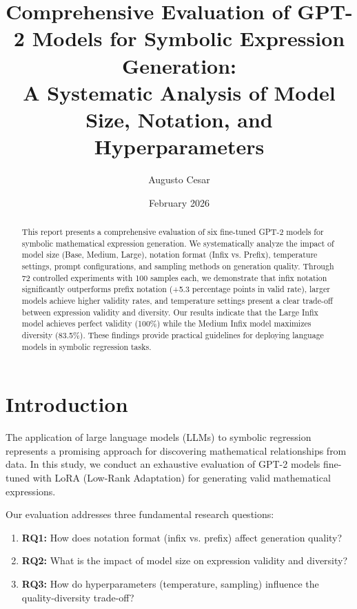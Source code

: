 \documentclass[11pt,a4paper]{article}
\title{Comprehensive Evaluation of GPT-2 Models for Symbolic Expression Generation:\\
A Systematic Analysis of Model Size, Notation, and Hyperparameters}
\author{Augusto Cesar}
\date{February 2026}
\begin{document}
\maketitle

\begin{abstract}
This report presents a comprehensive evaluation of six fine-tuned GPT-2 models for symbolic mathematical expression generation. We systematically analyze the impact of model size (Base, Medium, Large), notation format (Infix vs. Prefix), temperature settings, prompt configurations, and sampling methods on generation quality. Through 72 controlled experiments with 100 samples each, we demonstrate that infix notation significantly outperforms prefix notation (+5.3 percentage points in valid rate), larger models achieve higher validity rates, and temperature settings present a clear trade-off between expression validity and diversity. Our results indicate that the Large Infix model achieves perfect validity (100\%) while the Medium Infix model maximizes diversity (83.5\%). These findings provide practical guidelines for deploying language models in symbolic regression tasks.
\end{abstract}

\section{Introduction}

The application of large language models (LLMs) to symbolic regression represents a promising approach for discovering mathematical relationships from data. In this study, we conduct an exhaustive evaluation of GPT-2 models fine-tuned with LoRA (Low-Rank Adaptation) for generating valid mathematical expressions.

Our evaluation addresses three fundamental research questions:
\begin{enumerate}
    \item \textbf{RQ1:} How does notation format (infix vs. prefix) affect generation quality?
    \item \textbf{RQ2:} What is the impact of model size on expression validity and diversity?
    \item \textbf{RQ3:} How do hyperparameters (temperature, sampling) influence the quality-diversity trade-off?
\end{enumerate}
\end{document}
